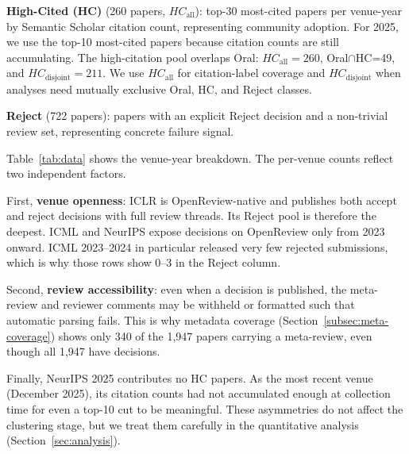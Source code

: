 \documentclass[10pt,a4paper]{article}
\begin{document}
\textbf{\textcolor{cgold}{High-Cited (HC)}} (260 papers, \(HC_{\mathrm{all}}\)): top-30 most-cited papers per venue-year by Semantic Scholar citation count, representing community adoption. For 2025, we use the top-10 most-cited papers because citation counts are still accumulating. The high-citation pool overlaps Oral: \(HC_{\mathrm{all}}=260\), Oral\(\cap\)HC=49, and \(HC_{\mathrm{disjoint}}=211\). We use \(HC_{\mathrm{all}}\) for citation-label coverage and \(HC_{\mathrm{disjoint}}\) when analyses need mutually exclusive Oral, HC, and Reject classes.

\textbf{\textcolor{cred}{Reject}} (722 papers): papers with an explicit Reject decision and a non-trivial review set, representing concrete failure signal.

Table~\ref{tab:data} shows the venue-year breakdown. The per-venue counts reflect two independent factors.

First, \textbf{venue openness}: ICLR is OpenReview-native and publishes both accept and reject decisions with full review threads. Its Reject pool is therefore the deepest. ICML and NeurIPS expose decisions on OpenReview only from 2023 onward. ICML 2023--2024 in particular released very few rejected submissions, which is why those rows show 0--3 in the Reject column.

Second, \textbf{review accessibility}: even when a decision is published, the meta-review and reviewer comments may be withheld or formatted such that automatic parsing fails. This is why metadata coverage (Section~\ref{subsec:meta-coverage}) shows only 340 of the 1{,}947 papers carrying a meta-review, even though all 1{,}947 have decisions.

Finally, NeurIPS 2025 contributes no HC papers. As the most recent venue (December 2025), its citation counts had not accumulated enough at collection time for even a top-10 cut to be meaningful. These asymmetries do not affect the clustering stage, but we treat them carefully in the quantitative analysis (Section~\ref{sec:analysis}).
\end{document}
